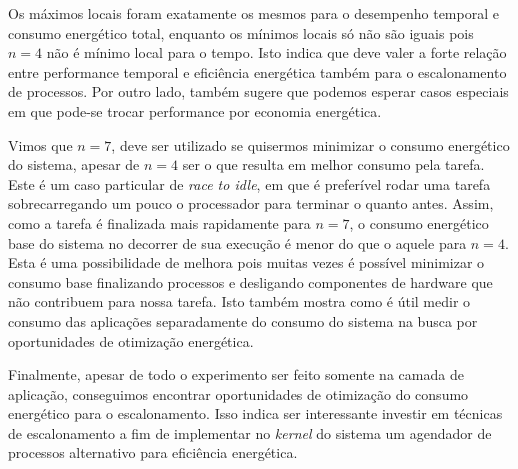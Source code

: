 Os máximos locais foram exatamente os mesmos para o desempenho temporal e consumo energético total, enquanto os mínimos locais só não são iguais pois $ n = 4 $ não é mínimo local para o tempo. Isto indica que deve valer a forte relação entre performance temporal e eficiência energética também para o escalonamento de processos. Por outro lado, também sugere que podemos esperar casos especiais em que pode-se trocar performance por economia energética.

Vimos que $ n = 7 $, deve ser utilizado se quisermos minimizar o consumo energético do sistema, apesar de $ n = 4 $ ser o que resulta em melhor consumo pela tarefa. Este é um caso particular de \emph{race to idle}, em que é preferível rodar uma tarefa sobrecarregando um pouco o processador para terminar o quanto antes. Assim, como a tarefa é finalizada mais rapidamente para $ n = 7 $, o consumo energético base do sistema no decorrer de sua execução é menor do que o aquele para $ n = 4 $. Esta é uma possibilidade de melhora pois muitas vezes é possível minimizar o consumo base finalizando processos e desligando componentes de hardware que não contribuem para nossa tarefa. Isto também mostra como é útil medir o consumo das aplicações separadamente do consumo do sistema na busca por oportunidades de otimização energética.

Finalmente, apesar de todo o experimento ser feito somente na camada de aplicação, conseguimos encontrar oportunidades de otimização do consumo energético para o escalonamento. Isso indica ser interessante investir em técnicas de escalonamento a fim de implementar no \emph{kernel} do sistema um agendador de processos alternativo para eficiência energética.

